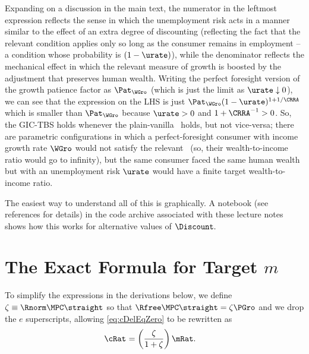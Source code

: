 \documentclass{handout}
\begin{document}
Expanding on a discussion in the main text, the numerator in the leftmost expression reflects the sense in which the unemployment risk acts in a manner similar to the effect of an extra degree of discounting (reflecting the fact that the relevant condition applies only so long as the consumer remains in employment -- a condition whose probability is $(1-\urate)$), while the denominator reflects the mechanical effect in which the relevant measure of growth is boosted by the adjustment that preserves human wealth.  Writing the perfect foresight version of the growth patience factor as $\Pat_{\WGro}$ (which is just the limit as $\urate \downarrow 0$), we can see that the expression on the LHS is just $\Pat_{\WGro}(1-\urate)^{1+1/\CRRA}$ which is smaller than $\Pat_{\WGro}$ because $\urate>0$ and $1+\CRRA^{-1} > 0$.  So, the GIC-TBS holds whenever the plain-vanilla \GICPGro~holds, but not vice-versa; there are parametric configurations in which a perfect-foresight consumer with income growth rate $\WGro$ would not satisfy the relevant \GICWGro~(so, their wealth-to-income ratio would go to infinity), but the same consumer faced the same human wealth but with an unemployment risk $\urate$ would have a finite target wealth-to-income ratio.  


The easiest way to understand all of this is graphically.  A notebook \cite{When-FHWC-Holds} (see references for details) in the code archive associated with these lecture notes shows how this works for alternative values of $\Discount.$


\section{The Exact Formula for Target $m$}\label{sec:mTargExact}

To simplify the expressions in the derivations below, we define $\zeta \equiv \Rnorm \MPCU \straight$ so that $\Rfree \MPCU \straight = \zeta \PGro$ and we drop the $e$ superscripts, allowing \eqref{eq:cDelEqZero} to be rewritten as 
\begin{equation}\begin{gathered}\begin{aligned}
  \cRat_{\tSS} & =  \left(\frac{\zeta }{1+\zeta}\right)\mRat .
\end{aligned}\end{gathered}\end{equation}
\end{document}
